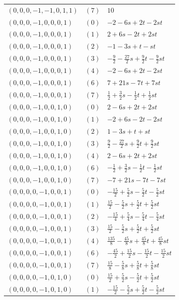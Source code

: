 \begin{longtable}{@{}lll@{}}
$(0,0,0,-1,-1,0,1,1)$ & $(7)$ & $10$\\
$(0,0,0,-1,0,0,0,1)$ & $(0)$ & $-2-6s+2t-2st$\\
$(0,0,0,-1,0,0,0,1)$ & $(1)$ & $2+6s-2t+2st$\\
$(0,0,0,-1,0,0,0,1)$ & $(2)$ & $-1-3s+t-st$\\
$(0,0,0,-1,0,0,0,1)$ & $(3)$ & $-\frac{9}{2}-\frac{27}{2}s+\frac{9}{2}t-\frac{9}{2}st$\\
$(0,0,0,-1,0,0,0,1)$ & $(4)$ & $-2-6s+2t-2st$\\
$(0,0,0,-1,0,0,0,1)$ & $(6)$ & $7+21s-7t+7st$\\
$(0,0,0,-1,0,0,0,1)$ & $(7)$ & $\frac{1}{2}+\frac{3}{2}s-\frac{1}{2}t+\frac{1}{2}st$\\
$(0,0,0,-1,0,0,1,0)$ & $(0)$ & $2-6s+2t+2st$\\
$(0,0,0,-1,0,0,1,0)$ & $(1)$ & $-2+6s-2t-2st$\\
$(0,0,0,-1,0,0,1,0)$ & $(2)$ & $1-3s+t+st$\\
$(0,0,0,-1,0,0,1,0)$ & $(3)$ & $\frac{9}{2}-\frac{27}{2}s+\frac{9}{2}t+\frac{9}{2}st$\\
$(0,0,0,-1,0,0,1,0)$ & $(4)$ & $2-6s+2t+2st$\\
$(0,0,0,-1,0,0,1,0)$ & $(6)$ & $-\frac{1}{2}+\frac{3}{2}s-\frac{1}{2}t-\frac{1}{2}st$\\
$(0,0,0,-1,0,0,1,0)$ & $(7)$ & $-7+21s-7t-7st$\\
$(0,0,0,0,-1,0,0,1)$ & $(0)$ & $-\frac{15}{2}+\frac{5}{2}s-\frac{5}{2}t-\frac{5}{2}st$\\
$(0,0,0,0,-1,0,0,1)$ & $(1)$ & $\frac{15}{2}-\frac{5}{2}s+\frac{5}{2}t+\frac{5}{2}st$\\
$(0,0,0,0,-1,0,0,1)$ & $(2)$ & $-\frac{15}{4}+\frac{5}{4}s-\frac{5}{4}t-\frac{5}{4}st$\\
$(0,0,0,0,-1,0,0,1)$ & $(3)$ & $\frac{15}{2}-\frac{5}{2}s+\frac{5}{2}t+\frac{5}{2}st$\\
$(0,0,0,0,-1,0,0,1)$ & $(4)$ & $\frac{135}{8}-\frac{45}{8}s+\frac{45}{8}t+\frac{45}{8}st$\\
$(0,0,0,0,-1,0,0,1)$ & $(6)$ & $-\frac{45}{2}+\frac{15}{2}s-\frac{15}{2}t-\frac{15}{2}st$\\
$(0,0,0,0,-1,0,0,1)$ & $(7)$ & $\frac{15}{8}-\frac{5}{8}s+\frac{5}{8}t+\frac{5}{8}st$\\
$(0,0,0,0,-1,0,1,0)$ & $(0)$ & $\frac{15}{2}+\frac{5}{2}s-\frac{5}{2}t+\frac{5}{2}st$\\
$(0,0,0,0,-1,0,1,0)$ & $(1)$ & $-\frac{15}{2}-\frac{5}{2}s+\frac{5}{2}t-\frac{5}{2}st$\\

\end{longtable}

